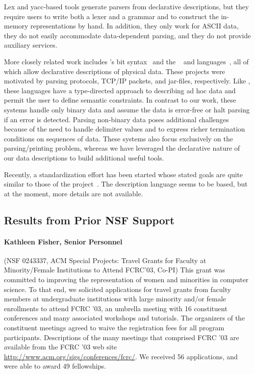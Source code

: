 \documentclass[11pt]{article}
\begin{document}
Lex and yacc-based tools generate parsers from declarative
descriptions, but they require users to write both a lexer and a
grammar and to construct the in-memory representations by hand.  In
addition, they only work for ASCII data, they do not easily
accommodate data-dependent parsing, and they do not provide auxiliary
services.

More closely related work includes \erlang{}'s bit syntax~\cite{erlang} and
the \packettypes{}~\cite{sigcomm00} and
\datascript{} languages~\cite{gpce02}, 
all of which allow declarative descriptions of physical data.  These projects were motivated by parsing protocols,
\textsc{TCP/IP} packets, and \java{} jar-files, respectively.  Like
\pads{}, these languages have a type-directed approach to
describing ad hoc data and permit the user to define semantic constraints.
In contrast to our
work, these systems handle only binary data and assume the data is
error-free or halt parsing if an error is detected. 
Parsing non-binary data poses additional challenges because of the need
to handle delimiter values and to express richer termination conditions
on sequences of data. These systems also
focus exclusively on the parsing/printing problem, whereas we have 
leveraged the declarative nature of
our data descriptions to build additional useful tools.


Recently, a standardization effort has been started whose stated goals are quite similar to those of the \pads{} project~\cite{dfdl}. The description
language seems to be \xml{} based, but at the moment, more details are 
not available.

\subsection{Results from Prior NSF Support}
\label{ssec:results}

\paragraph*{Kathleen Fisher, Senior Personnel} (NSF 0243337, ACM Special Projects: 
Travel Grants for Faculty at Minority/Female Institutions to Attend
FCRC'03, Co-PI) This grant was committed to improving the representation of women and
minorities in computer science. To that end, we solicited applications
for travel grants from faculty members at undergraduate institutions
with large minority and/or female enrollments to attend FCRC '03, an
umbrella meeting with 16 constituent conferences and many associated
workshops and tutorials.  The organizers of the constituent meetings agreed to waive
the registration fees for all program participants. 
Descriptions of the many meetings that
comprised FCRC '03 are available from the FCRC '03 web site 
\url{http://www.acm.org/sigs/conferences/fcrc/}.  We
received 56 applications, and were able to award 49
fellowships.
\end{document}
